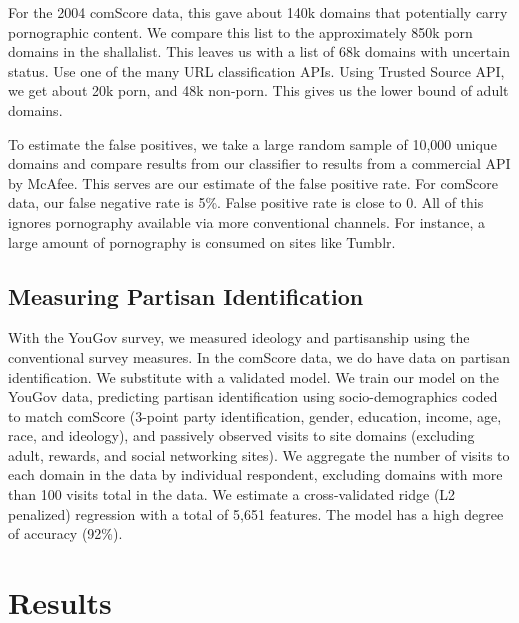 \documentclass[12pt, letterpaper]{article}
\begin{document}
For the 2004 comScore data, this gave about 140k domains that potentially carry pornographic content. We compare this list to the approximately 850k porn domains in the shallalist. This leaves us with a list of 68k domains with uncertain status. Use one of the many URL classification APIs. Using Trusted Source API, we get about 20k porn, and 48k non-porn. This gives us the lower bound of adult domains. 

To estimate the false positives, we take a large random sample of 10,000 unique domains and compare results from our classifier to results from a commercial API by McAfee. This serves are our estimate of the false positive rate. For comScore data, our false negative rate is 5\%. False positive rate is close to 0. All of this ignores pornography available via more conventional channels. For instance, a large amount of pornography is consumed on sites like Tumblr. 

\subsection{Measuring Partisan Identification}
With the YouGov survey, we measured ideology and partisanship using the conventional survey measures. In the comScore data, we do have data on partisan identification. We substitute with a validated model. We train our model on the YouGov data, predicting partisan identification using socio-demographics coded to match comScore (3-point party identification, gender, education, income, age, race, and ideology), and passively observed visits to site domains (excluding adult, rewards, and social networking sites). We aggregate the number of visits to each domain in the data by individual respondent, excluding domains with more than 100 visits total in the data. We estimate a cross-validated ridge (L2 penalized) regression with a total of 5,651 features. The model has a high degree of accuracy (92\%). %

\section*{Results}


\end{document}
